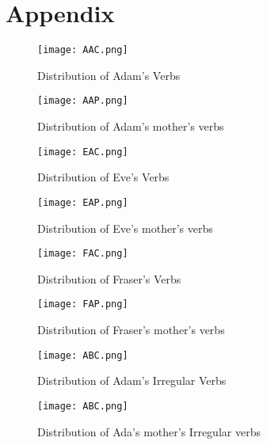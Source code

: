 \newpage
\section*{Appendix}
\begin{figure}[!htb]
\begin{minipage}{0.48\linewidth}
    \texttt{[image: AAC.png]}
    \caption{Distribution of Adam's Verbs}
\end{minipage}
\begin{minipage}{0.54\linewidth}
    \texttt{[image: AAP.png]}
    \caption{Distribution of Adam's mother's verbs}
\end{minipage}
\end{figure}
\vspace{-2em}
\begin{figure}[!htb]
\begin{minipage}{0.48\linewidth}
\centering
    \texttt{[image: EAC.png]}
    \caption{Distribution of Eve's Verbs}
\end{minipage}
\begin{minipage}{0.53\linewidth}
\centering    \texttt{[image: EAP.png]}
    \caption{Distribution of Eve's mother's verbs}
\end{minipage}
\end{figure}
\vspace{-2em}
\begin{figure}[!htb]
\begin{minipage}{0.5\linewidth}
    \texttt{[image: FAC.png]}
    \caption{Distribution of Fraser's Verbs}
\end{minipage}
\begin{minipage}{0.55\linewidth}
    \texttt{[image: FAP.png]}
    \caption{Distribution of Fraser's mother's verbs}
\end{minipage}
\end{figure}
\vspace{-2em}
\begin{figure}[!htb]
\begin{minipage}{0.5\linewidth}
    \texttt{[image: ABC.png]}
    \caption{Distribution of Adam's Irregular Verbs}
\end{minipage}
\begin{minipage}{0.5\linewidth}
\centering    \texttt{[image: ABC.png]}
    \caption{Distribution of Ada's mother's Irregular verbs}
\end{minipage}
\end{figure}
\vspace{-2em}
